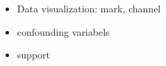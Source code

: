 \documentclass{article}
\begin{document}
\begin{itemize}
    \item Data visualization: mark, channel
    \item confounding variabels
    \item support
\end{itemize}
\end{document}
